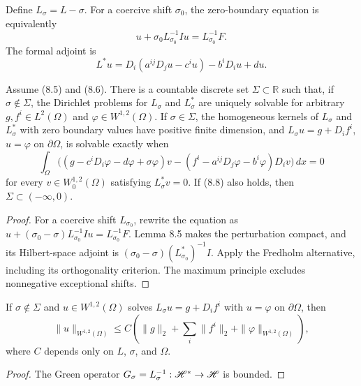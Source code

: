 Define $L_\sigma=L-\sigma$. For a coercive shift $\sigma_0$, the zero-boundary
equation is equivalently
\begin{equation}
u+\sigma_0L_{\sigma_0}^{-1}Iu=L_{\sigma_0}^{-1}F.
\tag{8.13}
\end{equation}
The formal adjoint is
\begin{equation}
L^*u=D_i(a^{ij}D_ju-c^iu)-b^iD_iu+du.
\tag{8.14}
\end{equation}

\begin{theorem}
\label{gt-thm-8-6-fredholm-alternative}
Assume (8.5) and (8.6). There is a countable discrete set
$\Sigma\subset\mathbb R$ such that, if $\sigma\notin\Sigma$, the Dirichlet
problems for $L_\sigma$ and $L_\sigma^*$ are uniquely solvable for arbitrary
$g,f^i\in L^2(\Omega)$ and $\varphi\in W^{1,2}(\Omega)$. If
$\sigma\in\Sigma$, the homogeneous kernels of $L_\sigma$ and $L_\sigma^*$
with zero boundary values have positive finite dimension, and
$L_\sigma u=g+D_if^i$, $u=\varphi$ on $\partial\Omega$, is solvable exactly when
\begin{equation}
\int_\Omega\bigl((g-c^iD_i\varphi-d\varphi+\sigma\varphi)v
 -(f^i-a^{ij}D_j\varphi-b^i\varphi)D_iv\bigr)\,dx=0
\tag{8.15}
\end{equation}
for every $v\in W_0^{1,2}(\Omega)$ satisfying $L_\sigma^*v=0$. If (8.8)
also holds, then $\Sigma\subset(-\infty,0)$.
\end{theorem}
\begin{proof}
\sketch For a coercive shift $L_{\sigma_0}$, rewrite the equation as
$u+(\sigma_0-\sigma)L_{\sigma_0}^{-1}Iu=L_{\sigma_0}^{-1}F$. Lemma 8.5
makes the perturbation compact, and its Hilbert-space adjoint is
$(\sigma_0-\sigma)(L_{\sigma_0}^*)^{-1}I$. Apply the Fredholm alternative,
including its orthogonality criterion. The maximum principle excludes
nonnegative exceptional shifts.
\end{proof}

\begin{corollary}
\label{gt-cor-8-7-resolvent-estimate}
If $\sigma\notin\Sigma$ and $u\in W^{1,2}(\Omega)$ solves
$L_\sigma u=g+D_if^i$ with $u=\varphi$ on $\partial\Omega$, then
\begin{equation}
\|u\|_{W^{1,2}(\Omega)}
\leq C\left(\|g\|_2+\sum_i\|f^i\|_2
+\|\varphi\|_{W^{1,2}(\Omega)}\right),
\tag{8.16}
\end{equation}
where $C$ depends only on $L$, $\sigma$, and $\Omega$.
\end{corollary}
\begin{proof}
\sketch The Green operator $G_\sigma=L_\sigma^{-1}:\mathscr{H}^*\to\mathscr{H}$ is bounded.
\end{proof}

